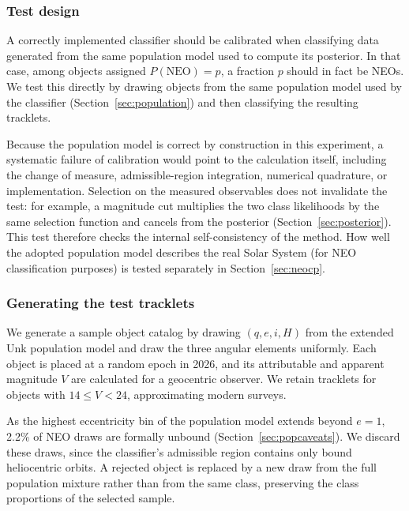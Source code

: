 \documentclass[linenumbers,twocolumn]{aastex701}
\begin{document}
\subsubsection{Test design}
\label{sec:testdesign}

A correctly implemented classifier should be calibrated when classifying data generated from
the same population model used to compute its posterior. In that case, among
objects assigned $P(\mathrm{NEO})=p$, a fraction $p$ should in fact be NEOs.
We test this directly by drawing objects from the same population model used
by the classifier (Section~\ref{sec:population}) and then classifying the resulting
tracklets.

Because the population model is correct by construction in this experiment,
a systematic failure of calibration would point to the calculation itself,
including the change of measure, admissible-region integration, numerical
quadrature, or implementation. Selection on the measured observables does not
invalidate the test: for example, a magnitude cut multiplies the two class
likelihoods by the same selection function and cancels from the posterior
(Section~\ref{sec:posterior}). This test therefore checks the internal
self-consistency of the method. How well the adopted population model describes the real Solar System (for NEO classification purposes) is tested separately in Section~\ref{sec:neocp}.

\subsubsection{Generating the test tracklets}
\label{sec:generator}

We generate a sample object catalog by drawing $(q,e,i,H)$ from the extended Unk population model and draw the three angular elements uniformly. Each object is placed at a random epoch in 2026, and its attributable and apparent magnitude $V$ are calculated for a geocentric observer. We retain tracklets for objects with $14\leq V<24$, approximating modern surveys.

As the highest eccentricity bin of the population model extends beyond $e=1$, 2.2\% of NEO draws are formally unbound (Section~\ref{sec:popcaveats}). We discard these draws, since the classifier's admissible region contains only bound heliocentric orbits. A rejected object is replaced by a new draw from the full population mixture rather than from the same class, preserving the class proportions of the selected sample.
\end{document}
